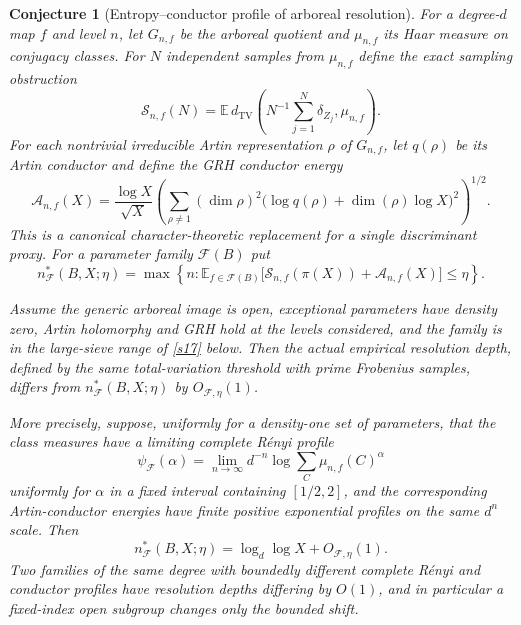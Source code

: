 \documentclass[11pt]{article}
\newtheorem{conjecture}{Conjecture}
\theoremstyle{definition}
\newcommand{\E}{\mathbb E}
\providecommand{\E}{\mathbb E}
\begin{document}
\begin{conjecture}[Entropy--conductor profile of arboreal resolution]\label{s16}
For a degree-$d$ map $f$ and level $n$, let $G_{n,f}$ be the arboreal quotient and
$\mu_{n,f}$ its Haar measure on conjugacy classes.  For $N$ independent samples from
$\mu_{n,f}$ define the exact sampling obstruction
\[
 \mathcal S_{n,f}(N)=
 \E\,d_{\mathrm{TV}}\!\left(N^{-1}\sum_{j=1}^N\delta_{Z_j},\mu_{n,f}\right).
\]
For each nontrivial irreducible Artin representation $\rho$ of $G_{n,f}$, let
$q(\rho)$ be its Artin conductor and define the GRH conductor energy
\[
 \mathcal A_{n,f}(X)=
 \frac{\log X}{\sqrt X}
 \left(\sum_{\rho\ne1}(\dim\rho)^2
  \bigl(\log q(\rho)+\dim(\rho)\log X\bigr)^2\right)^{1/2}.
\]
This is a canonical character-theoretic replacement for a single discriminant proxy.
For a parameter family $\mathcal F(B)$ put
\[
 n^*_{\mathcal F}(B,X;\eta)=
 \max\left\{n:\E_{f\in\mathcal F(B)}
   \bigl[\mathcal S_{n,f}(\pi(X))+\mathcal A_{n,f}(X)\bigr]\le\eta\right\}.
\]

Assume the generic arboreal image is open, exceptional parameters have density zero,
Artin holomorphy and GRH hold at the levels considered, and the family is in the large-sieve range of \cref{s17} below.  Then the actual empirical resolution depth, defined by
the same total-variation threshold with prime Frobenius samples, differs from
$n^*_{\mathcal F}(B,X;\eta)$ by $O_{\mathcal F,\eta}(1)$.

More precisely, suppose, uniformly for a density-one set of parameters, that the class
measures have a limiting complete R\'enyi profile
\[
 \psi_{\mathcal F}(\alpha)=
 \lim_{n\to\infty}d^{-n}\log\sum_C\mu_{n,f}(C)^\alpha
\]
uniformly for $\alpha$ in a fixed interval containing $[1/2,2]$, and the corresponding
Artin-conductor energies have finite positive exponential profiles on the same
$d^n$ scale.  Then
\[
 n^*_{\mathcal F}(B,X;\eta)=\log_d\log X+O_{\mathcal F,\eta}(1).
\]
Two families of the same degree with boundedly different complete R\'enyi and conductor
profiles have resolution depths differing by $O(1)$, and in particular a fixed-index open
subgroup changes only the bounded shift.
\end{conjecture}
\end{document}
